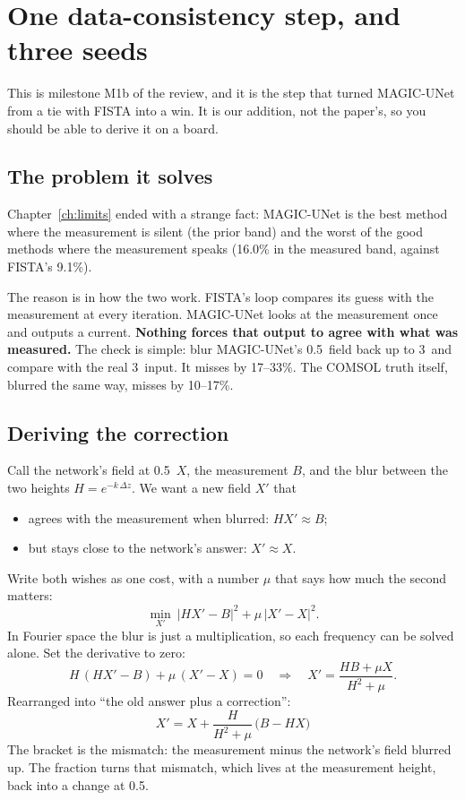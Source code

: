 \chapter{One data-consistency step, and three seeds}\label{ch:consistency}

This is milestone M1b of the review, and it is the step that turned MAGIC-UNet from a tie with FISTA into a win. It is
our addition, not the paper's, so you should be able to derive it on a board.

\section{The problem it solves}

Chapter~\ref{ch:limits} ended with a strange fact: MAGIC-UNet is the best method where the measurement is silent (the
prior band) and the worst of the good methods where the measurement speaks (16.0\% in the measured band, against
FISTA's 9.1\%).

The reason is in how the two work. FISTA's loop compares its guess with the measurement at every iteration. MAGIC-UNet
looks at the measurement once and outputs a current. \textbf{Nothing forces that output to agree with what was measured.}
The check is simple: blur MAGIC-UNet's 0.5\um\ field back up to 3\um\ and compare with the real 3\um\ input. It misses by
17--33\%. The COMSOL truth itself, blurred the same way, misses by 10--17\%.

\section{Deriving the correction}

Call the network's field at 0.5\um\ $X$, the measurement $B$, and the blur between the two heights $H=e^{-k\,\Delta z}$.
We want a new field $X'$ that
\begin{itemize}
\item agrees with the measurement when blurred: $HX'\approx B$;
\item but stays close to the network's answer: $X'\approx X$.
\end{itemize}
Write both wishes as one cost, with a number $\mu$ that says how much the second matters:
\[
\min_{X'}\ |HX'-B|^2+\mu\,|X'-X|^2 .
\]
In Fourier space the blur is just a multiplication, so each frequency can be solved alone. Set the derivative to zero:
\[
H\,(HX'-B)+\mu\,(X'-X)=0
\quad\Longrightarrow\quad
X'=\frac{HB+\mu X}{H^2+\mu}.
\]
Rearranged into ``the old answer plus a correction'':
\[
\boxed{\;X'=X+\frac{H}{H^2+\mu}\,\bigl(B-HX\bigr)\;}
\]
The bracket is the mismatch: the measurement minus the network's field blurred up. The fraction turns that mismatch,
which lives at the measurement height, back into a change at 0.5\um.

